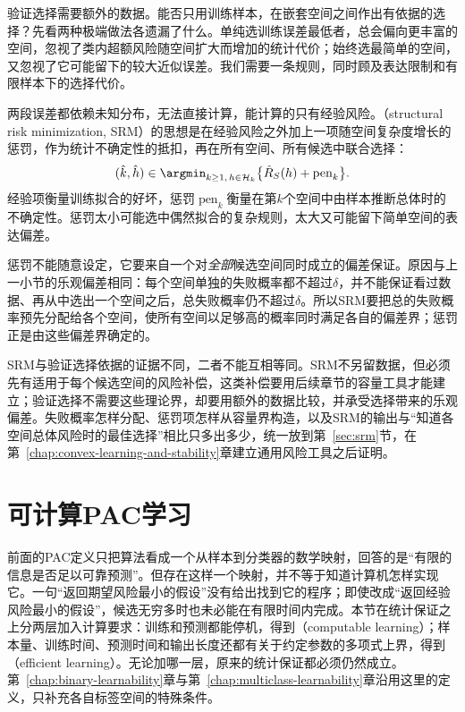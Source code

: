 验证选择需要额外的数据。能否只用训练样本，在嵌套空间之间作出有依据的选择？先看两种极端做法各遗漏了什么。单纯选训练误差最低者，总会偏向更丰富的空间，忽视了类内超额风险随空间扩大而增加的统计代价；始终选最简单的空间，又忽视了它可能留下的较大近似误差。我们需要一条规则，同时顾及表达限制和有限样本下的选择代价。

两段误差都依赖未知分布，无法直接计算，能计算的只有经验风险。（structural risk minimization, SRM）的思想是在经验风险之外加上一项随空间复杂度增长的惩罚，作为统计不确定性的抵扣，再在所有空间、所有候选中联合选择：
\[
 (\hat k,\hat h)\in\argmin_{k\geq1,\,h\in\mathcal H_k}\bigl\{\hat R_S(h)+\operatorname{pen}_k\bigr\}.
\]
经验项衡量训练拟合的好坏，惩罚$\operatorname{pen}_k$衡量在第$k$个空间中由样本推断总体时的不确定性。惩罚太小可能选中偶然拟合的复杂规则，太大又可能留下简单空间的表达偏差。

惩罚不能随意设定，它要来自一个对\emph{全部}候选空间同时成立的偏差保证。原因与上一小节的乐观偏差相同：每个空间单独的失败概率都不超过$\delta$，并不能保证看过数据、再从中选出一个空间之后，总失败概率仍不超过$\delta$。所以SRM要把总的失败概率预先分配给各个空间，使所有空间以足够高的概率同时满足各自的偏差界；惩罚正是由这些偏差界确定的。

SRM与验证选择依据的证据不同，二者不能互相等同。SRM不另留数据，但必须先有适用于每个候选空间的风险补偿，这类补偿要用后续章节的容量工具才能建立；验证选择不需要这些理论界，却要用额外的数据比较，并承受选择带来的乐观偏差。失败概率怎样分配、惩罚项怎样从容量界构造，以及SRM的输出与“知道各空间总体风险时的最佳选择”相比只多出多少，统一放到第~\ref{sec:srm}节，在第~\ref{chap:convex-learning-and-stability}章建立通用风险工具之后证明。

\section{可计算PAC学习}
\label{sec:computable-pac}
\label{sec:pac-computation-requirements}

前面的PAC定义只把算法看成一个从样本到分类器的数学映射，回答的是“有限的信息是否足以可靠预测”。但存在这样一个映射，并不等于知道计算机怎样实现它。一句“返回期望风险最小的假设”没有给出找到它的程序；即使改成“返回经验风险最小的假设”，候选无穷多时也未必能在有限时间内完成。本节在统计保证之上分两层加入计算要求：训练和预测都能停机，得到（computable learning）；样本量、训练时间、预测时间和输出长度还都有关于约定参数的多项式上界，得到（efficient learning）。无论加哪一层，原来的统计保证都必须仍然成立。第~\ref{chap:binary-learnability}章与第~\ref{chap:multiclass-learnability}章沿用这里的定义，只补充各自标签空间的特殊条件。

